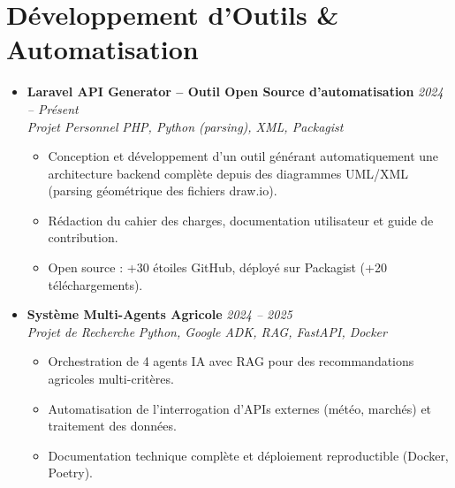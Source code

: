 \documentclass[a4paper,11pt]{article}
\begin{document}
\section{Développement d'Outils \& Automatisation}
\begin{itemize}[leftmargin=*, label={-}]

\item \textbf{Laravel API Generator -- Outil Open Source d'automatisation} \hfill \textit{2024 -- Présent} \\
\textit{Projet Personnel} \hfill \textit{PHP, Python (parsing), XML, Packagist}
\vspace{-2pt}
    \begin{itemize}[leftmargin=0.4cm, nosep, label=\tiny$\bullet$]
        \item \small{Conception et développement d'un outil générant automatiquement une architecture backend complète depuis des diagrammes UML/XML (parsing géométrique des fichiers draw.io).}
        \item \small{Rédaction du cahier des charges, documentation utilisateur et guide de contribution.}
        \item \small{Open source : +30 étoiles GitHub, déployé sur Packagist (+20 téléchargements).}
    \end{itemize}
\vspace{3pt}

\item \textbf{Système Multi-Agents Agricole} \hfill \textit{2024 -- 2025} \\
\textit{Projet de Recherche} \hfill \textit{Python, Google ADK, RAG, FastAPI, Docker}
\vspace{-2pt}
    \begin{itemize}[leftmargin=0.4cm, nosep, label=\tiny$\bullet$]
        \item \small{Orchestration de 4 agents IA avec RAG pour des recommandations agricoles multi-critères.}
        \item \small{Automatisation de l'interrogation d'APIs externes (météo, marchés) et traitement des données.}
        \item \small{Documentation technique complète et déploiement reproductible (Docker, Poetry).}
    \end{itemize}
\vspace{3pt}

\end{itemize}

\end{document}
